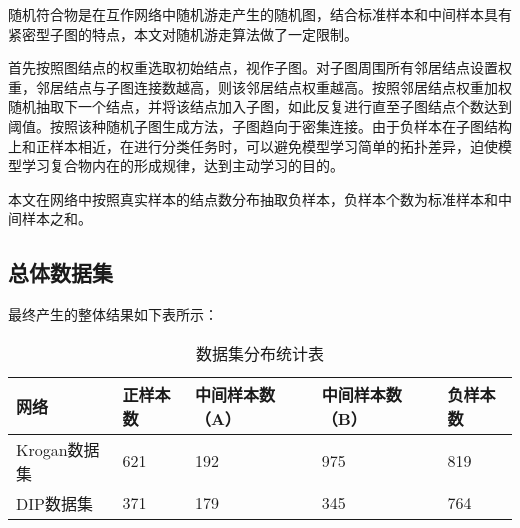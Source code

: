 随机符合物是在互作网络中随机游走产生的随机图，结合标准样本和中间样本具有紧密型子图的特点，本文对随机游走算法做了一定限制。

首先按照图结点的权重选取初始结点，视作子图。对子图周围所有邻居结点设置权重，邻居结点与子图连接数越高，则该邻居结点权重越高。按照邻居结点权重加权随机抽取下一个结点，并将该结点加入子图，如此反复进行直至子图结点个数达到阈值。按照该种随机子图生成方法，子图趋向于密集连接。由于负样本在子图结构上和正样本相近，在进行分类任务时，可以避免模型学习简单的拓扑差异，迫使模型学习复合物内在的形成规律，达到主动学习的目的。

本文在网络中按照真实样本的结点数分布抽取负样本，负样本个数为标准样本和中间样本之和。

\subsection{总体数据集}
\label{subsection:allComplex}
最终产生的整体结果如下表所示：

\begin{table}[h]
    \centering
    \caption{数据集分布统计表}
    \label{tab:datasets:statistic}
    \begin{tabular}{C{3cm}C{3cm}C{3cm}C{3cm}C{3cm}}
        \toprule
        \textbf{网络} & \textbf{正样本数} & \textbf{中间样本数（A）} & \textbf{中间样本数（B）} & \textbf{负样本数} \\
        \midrule
        Krogan数据集  & 621               & 192                      & 975                      & 819               \\
        DIP数据集     & 371               & 179                      & 345                      & 764               \\
        \bottomrule
    \end{tabular}
\end{table}

